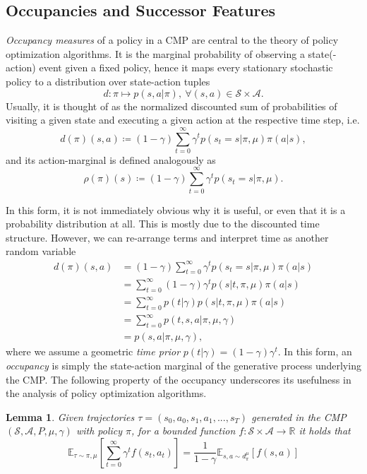 \documentclass{article}
\theoremstyle{plain}
\newtheorem{lemma}[theorem]{Lemma}
\theoremstyle{definition}
\theoremstyle{remark}
\newcommand{\sS}{\mathcal{S}}
\newcommand{\sA}{\mathcal{A}}
\begin{document}
\subsection{Occupancies and Successor Features}
\emph{Occupancy measures} of a policy in a CMP are central to the theory of policy optimization algorithms. It is the marginal probability of observing a state(-action) event given a fixed policy, hence it maps every stationary stochastic policy to a distribution over state-action tuples $$d:\pi\mapsto p(s,a|\pi),\ \forall(s,a)\in \sS\times\sA.$$
Usually, it is thought of as the normalized discounted sum of probabilities of visiting a given state and executing a given action at the respective time step, i.e.
\begin{equation}
    d(\pi)(s,a) \coloneqq (1-\gamma)
    \sum_{t=0}^\infty \gamma^t p(s_t = s|\pi,\mu) \pi(a|s),
\end{equation}
and its action-marginal is defined analogously as
\begin{equation}
    \rho(\pi)(s) \coloneqq (1-\gamma)
    \sum_{t=0}^\infty \gamma^t p(s_t = s|\pi,\mu).
\end{equation}

In this form, it is not immediately obvious why it is useful, or even that it is a probability distribution at all. This is mostly due to the discounted time structure. However, we can re-arrange terms and interpret time as another random variable 
\begin{align}
    d(\pi)(s,a) &= (1-\gamma)
    \sum_{t=0}^\infty \gamma^t p(s_t = s|\pi,\mu) \pi(a|s)\\
    &= \sum_{t=0}^\infty (1-\gamma)\gamma^t p(s|t, \pi,\mu) \pi(a|s)\\
    &= \sum_{t=0}^\infty p(t|\gamma) p(s|t, \pi,\mu) \pi(a|s)\\
    &= \sum_{t=0}^\infty p(t, s, a | \pi,\mu, \gamma)\\
    &= p(s, a | \pi,\mu, \gamma),
\end{align}
where we assume a geometric \emph{time prior} $p(t|\gamma)=(1-\gamma)\gamma^t$. In this form, an \emph{occupancy} is simply the state-action marginal of the generative process underlying the CMP. The following property of the occupancy underscores its usefulness in the analysis of policy optimization algorithms. 

\begin{lemma}
Given trajectories $\tau=(s_0,a_0,s_1,a_1,...,s_T)$ generated in the CMP $(\sS,\sA,P,\mu,\gamma)$ with policy $\pi$, for a bounded function $f:\sS\times\sA\to\mathbb{R}$ it holds that
    \begin{equation}\label{eq:discounted-expectation}
        \mathbb{E}_{\tau \sim \pi,\mu} \left[ \sum_{t=0}^\infty \gamma^t f(s_t, a_t) \right] = \frac{1}{1-\gamma}\mathbb{E}_{s, a \sim d^\mu_\pi} [f(s, a)]
    \end{equation}
\end{lemma}
\end{document}
